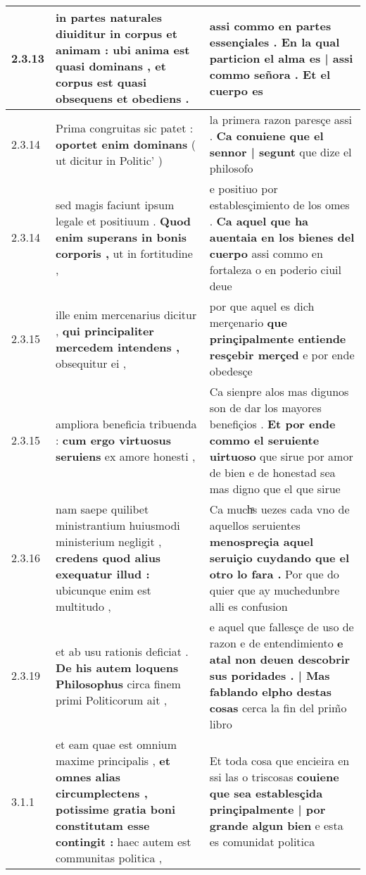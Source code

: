 \begin{tabular}{|p{1cm}|p{6.5cm}|p{6.5cm}|}
2.3.13 & in partes naturales diuiditur in corpus et animam : \textbf{ ubi anima est quasi dominans , } et corpus est quasi obsequens et obediens . & assi commo en partes essençiales . \textbf{ En la qual particion el alma es | assi commo señora . } Et el cuerpo es \\\hline
2.3.14 & Prima congruitas sic patet : \textbf{ oportet enim dominans } ( ut dicitur in Politic’ ) & la primera razon paresçe assi . \textbf{ Ca conuiene que el sennor | segunt } que dize el philosofo \\\hline
2.3.14 & sed magis faciunt ipsum legale et positiuum . \textbf{ Quod enim superans in bonis corporis , } ut in fortitudine , & e positiuo por establesçimiento de los omes . \textbf{ Ca aquel que ha auentaia en los bienes del cuerpo } assi commo en fortaleza o en poderio ciuil deue \\\hline
2.3.15 & ille enim mercenarius dicitur , \textbf{ qui principaliter mercedem intendens , } obsequitur ei , & por que aquel es dich merçenario \textbf{ que prinçipalmente entiende resçebir merçed } e por ende obedesçe \\\hline
2.3.15 & ampliora beneficia tribuenda : \textbf{ cum ergo virtuosus seruiens } ex amore honesti , & Ca sienpre alos mas digunos son de dar los mayores benefiçios . \textbf{ Et por ende commo el seruiente uirtuoso } que sirue por amor de bien e de honestad sea mas digno que el que sirue \\\hline
2.3.16 & nam saepe quilibet ministrantium huiusmodi ministerium negligit , \textbf{ credens quod alius exequatur illud : } ubicunque enim est multitudo , & Ca muchͣs uezes cada vno de aquellos seruientes \textbf{ menospreçia aquel seruiçio cuydando que el otro lo fara . } Por que do quier que ay muchedunbre alli es confusion \\\hline
2.3.19 & et ab usu rationis deficiat . \textbf{ De his autem loquens Philosophus } circa finem primi Politicorum ait , & e aquel que fallesçe de uso de razon e de entendimiento \textbf{ e atal non deuen descobrir sus poridades . | Mas fablando elpho destas cosas } cerca la fin del prim̃o libro \\\hline
3.1.1 & et eam quae est omnium maxime principalis , \textbf{ et omnes alias circumplectens , potissime gratia boni constitutam esse contingit : } haec autem est communitas politica , & Et toda cosa que encieira en ssi las o triscosas \textbf{ couiene que sea establesçida prinçipalmente | por grande algun bien } e esta es comunidat politica \\\hline

\end{tabular}
